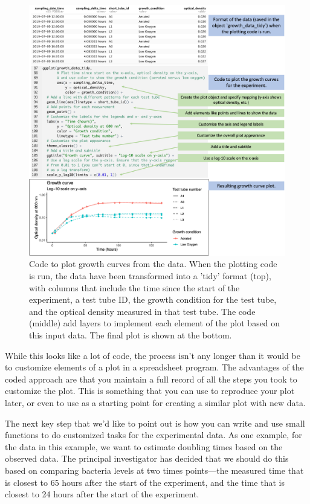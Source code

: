 \documentclass[]{tufte-book}
\begin{document}
\begin{figure}
\includegraphics[width=\textwidth]{figures/growth_curve_plot_code} \caption[Code to plot growth curves from the data]{Code to plot growth curves from the data. When the plotting code is run, the data have been transformed into a 'tidy' format (top), with columns that include the time since the start of the experiment, a test tube ID, the growth condition for the test tube, and the optical density measured in that test tube. The code (middle) add layers to implement each element of the plot based on this input data. The final plot is shown at the bottom.}\label{fig:growthplotcode}
\end{figure}

While this looks like a lot of code, the process isn't any longer than it would
be to customize elements of a plot in a spreadsheet program. The advantages of
the coded approach are that you maintain a full record of all the steps you took
to customize the plot. This is something that you can use to reproduce your plot
later, or even to use as a starting point for creating a similar plot with new
data.

The next key step that we'd like to point out is how you can write and use small
functions to do customized tasks for the experimental data. As one example, for
the data in this example, we want to estimate doubling times based on the
observed data. The principal investigator has decided that we should do this
based on comparing bacteria levels at two times points---the measured time that
is closest to 65 hours after the start of the experiment, and the time that is
closest to 24 hours after the start of the experiment.
\end{document}
